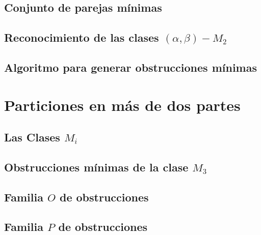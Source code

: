     \subsection{Conjunto de parejas mínimas}
        

    \subsection{Reconocimiento de las clases $(\alpha, \beta)-M_2$}

    \subsection{Algoritmo para generar obstrucciones mínimas}

\section{Particiones en más de dos partes}
    \subsection{Las Clases $M_i$}

    \subsection{Obstrucciones mínimas de la clase $M_3$}
        

    \subsection{Familia $O$ de obstrucciones}

    \subsection{Familia $P$ de obstrucciones}
